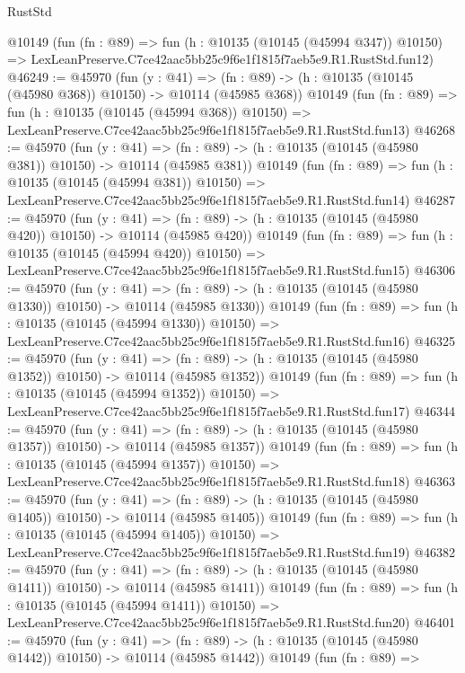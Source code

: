 \begin{lexlean}{RustStd}
\begin{coremodule}
    @10149
    (fun (fn : @89) =>
    fun (h : @10135 (@10145 (@45994 @347)) @10150) =>
    LexLeanPreserve.C7ce42aac5bb25c9f6e1f1815f7aeb5e9.R1.RustStd.fun12)
@46249 := @45970
    (fun (y : @41) =>
    (fn : @89) -> (h : @10135 (@10145 (@45980 @368)) @10150) -> @10114 (@45985 @368))
    @10149
    (fun (fn : @89) =>
    fun (h : @10135 (@10145 (@45994 @368)) @10150) =>
    LexLeanPreserve.C7ce42aac5bb25c9f6e1f1815f7aeb5e9.R1.RustStd.fun13)
@46268 := @45970
    (fun (y : @41) =>
    (fn : @89) -> (h : @10135 (@10145 (@45980 @381)) @10150) -> @10114 (@45985 @381))
    @10149
    (fun (fn : @89) =>
    fun (h : @10135 (@10145 (@45994 @381)) @10150) =>
    LexLeanPreserve.C7ce42aac5bb25c9f6e1f1815f7aeb5e9.R1.RustStd.fun14)
@46287 := @45970
    (fun (y : @41) =>
    (fn : @89) -> (h : @10135 (@10145 (@45980 @420)) @10150) -> @10114 (@45985 @420))
    @10149
    (fun (fn : @89) =>
    fun (h : @10135 (@10145 (@45994 @420)) @10150) =>
    LexLeanPreserve.C7ce42aac5bb25c9f6e1f1815f7aeb5e9.R1.RustStd.fun15)
@46306 := @45970
    (fun (y : @41) =>
    (fn : @89) -> (h : @10135 (@10145 (@45980 @1330)) @10150) -> @10114 (@45985 @1330))
    @10149
    (fun (fn : @89) =>
    fun (h : @10135 (@10145 (@45994 @1330)) @10150) =>
    LexLeanPreserve.C7ce42aac5bb25c9f6e1f1815f7aeb5e9.R1.RustStd.fun16)
@46325 := @45970
    (fun (y : @41) =>
    (fn : @89) -> (h : @10135 (@10145 (@45980 @1352)) @10150) -> @10114 (@45985 @1352))
    @10149
    (fun (fn : @89) =>
    fun (h : @10135 (@10145 (@45994 @1352)) @10150) =>
    LexLeanPreserve.C7ce42aac5bb25c9f6e1f1815f7aeb5e9.R1.RustStd.fun17)
@46344 := @45970
    (fun (y : @41) =>
    (fn : @89) -> (h : @10135 (@10145 (@45980 @1357)) @10150) -> @10114 (@45985 @1357))
    @10149
    (fun (fn : @89) =>
    fun (h : @10135 (@10145 (@45994 @1357)) @10150) =>
    LexLeanPreserve.C7ce42aac5bb25c9f6e1f1815f7aeb5e9.R1.RustStd.fun18)
@46363 := @45970
    (fun (y : @41) =>
    (fn : @89) -> (h : @10135 (@10145 (@45980 @1405)) @10150) -> @10114 (@45985 @1405))
    @10149
    (fun (fn : @89) =>
    fun (h : @10135 (@10145 (@45994 @1405)) @10150) =>
    LexLeanPreserve.C7ce42aac5bb25c9f6e1f1815f7aeb5e9.R1.RustStd.fun19)
@46382 := @45970
    (fun (y : @41) =>
    (fn : @89) -> (h : @10135 (@10145 (@45980 @1411)) @10150) -> @10114 (@45985 @1411))
    @10149
    (fun (fn : @89) =>
    fun (h : @10135 (@10145 (@45994 @1411)) @10150) =>
    LexLeanPreserve.C7ce42aac5bb25c9f6e1f1815f7aeb5e9.R1.RustStd.fun20)
@46401 := @45970
    (fun (y : @41) =>
    (fn : @89) -> (h : @10135 (@10145 (@45980 @1442)) @10150) -> @10114 (@45985 @1442))
    @10149
    (fun (fn : @89) =>

\end{coremodule}
\end{lexlean}
